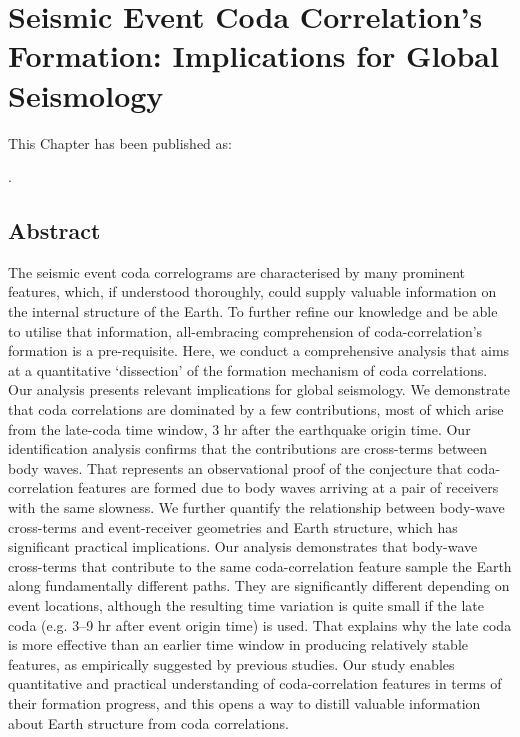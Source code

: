 \chapter{Seismic Event Coda Correlation's Formation: Implications for Global Seismology}\label{ch:theo}

This Chapter has been published as:
\begin{description}
	\item {}.
\end{description}
\bigskip




\section*{Abstract}\label{sec:theo_abstract}

The seismic event coda correlograms are characterised by many prominent features, which, if understood thoroughly, could supply valuable information on the internal structure of the Earth. To further refine our knowledge and be able to utilise that information, all-embracing comprehension of coda-correlation's formation is a pre-requisite. Here, we conduct a comprehensive analysis that aims at a quantitative `dissection' of the formation mechanism of coda correlations. Our analysis presents relevant implications for global seismology. We demonstrate that coda correlations are dominated by a few contributions, most of which arise from the late-coda time window, 3 hr after the earthquake origin time. Our identification analysis confirms that the contributions are cross-terms between body waves. That represents an observational proof of the conjecture that coda-correlation features are formed due to body waves arriving at a pair of receivers with the same slowness. We further quantify the relationship between body-wave cross-terms and event-receiver geometries and Earth structure, which has significant practical implications. Our analysis demonstrates that body-wave cross-terms that contribute to the same coda-correlation feature sample the Earth along fundamentally different paths. They are significantly different depending on event locations, although the resulting time variation is quite small if the late coda (e.g. 3--9 hr after event origin time) is used. That explains why the late coda is more effective than an earlier time window in producing relatively stable features, as empirically suggested by previous studies. Our study enables quantitative and practical understanding of coda-correlation features in terms of their formation progress, and this opens a way to distill valuable information about Earth structure from coda correlations.



